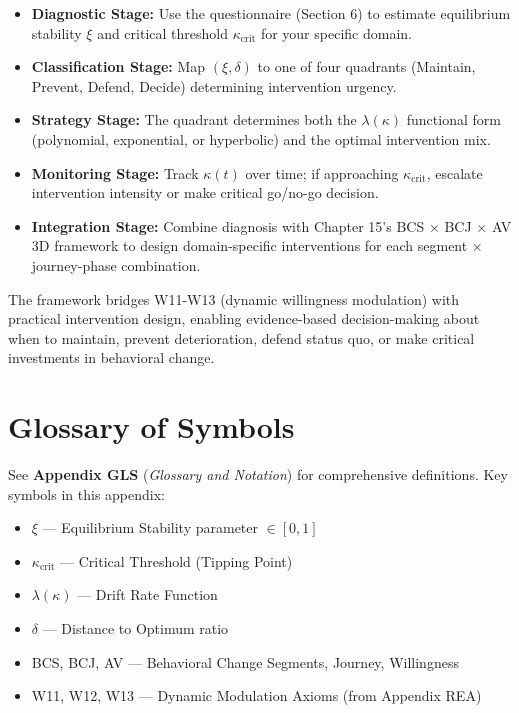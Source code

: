 \documentclass[11pt, a4paper]{article}
\begin{document}
\begin{itemize}
    \item \textbf{Diagnostic Stage:} Use the questionnaire (Section 6) to estimate equilibrium stability $\xi$ and critical threshold $\kappa_{\text{crit}}$ for your specific domain.

    \item \textbf{Classification Stage:} Map $(\xi, \delta)$ to one of four quadrants (Maintain, Prevent, Defend, Decide) determining intervention urgency.

    \item \textbf{Strategy Stage:} The quadrant determines both the $\lambda(\kappa)$ functional form (polynomial, exponential, or hyperbolic) and the optimal intervention mix.

    \item \textbf{Monitoring Stage:} Track $\kappa(t)$ over time; if approaching $\kappa_{\text{crit}}$, escalate intervention intensity or make critical go/no-go decision.

    \item \textbf{Integration Stage:} Combine diagnosis with Chapter 15's BCS × BCJ × AV 3D framework to design domain-specific interventions for each segment × journey-phase combination.
\end{itemize}

The framework bridges W11-W13 (dynamic willingness modulation) with practical intervention design, enabling evidence-based decision-making about when to maintain, prevent deterioration, defend status quo, or make critical investments in behavioral change.


\section{Glossary of Symbols}
\label{sec:bb-glossary}

See \textbf{Appendix GLS} (\textit{Glossary and Notation}) for comprehensive definitions.
Key symbols in this appendix:

\begin{itemize}[nosep]
    \item $\xi$ --- Equilibrium Stability parameter $\in [0,1]$
    \item $\kappa_{\text{crit}}$ --- Critical Threshold (Tipping Point)
    \item $\lambda(\kappa)$ --- Drift Rate Function
    \item $\delta$ --- Distance to Optimum ratio
    \item BCS, BCJ, AV --- Behavioral Change Segments, Journey, Willingness
    \item W11, W12, W13 --- Dynamic Modulation Axioms (from Appendix REA)
\end{itemize}
\end{document}
